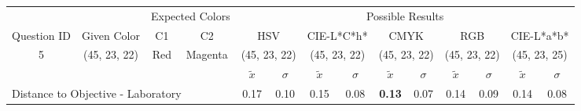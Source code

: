 \begin{table}[H]
  \resizebox{\textwidth}{!} {
  \begin{tabular}{lccccccccccccc}
    \hline
    \multicolumn{1}{c}{}                              &                                      & \multicolumn{2}{c}{Expected Colors}                   & \multicolumn{10}{c}{Possible Results}                                                                                                                                                                                                                                                                                        \\ \cline{3-14}
    \multicolumn{1}{c}{\multirow{-2}{*}{Question ID}} & \multirow{-2}{*}{Given Color}        & C1                       & C2                         & \multicolumn{2}{c}{HSV}                                        & \multicolumn{2}{c}{CIE-L*C*h*}                                 & \multicolumn{2}{c}{CMYK}                                       & \multicolumn{2}{c}{RGB}                                        & \multicolumn{2}{c}{CIE-L*a*b*}                                 \\ \hline
    \multicolumn{1}{c}{5}                             & \cellcolor[HTML]{FF0080}(45, 23, 22) & \multicolumn{1}{c|}{Red} & \multicolumn{1}{c|}{Magenta}  & \multicolumn{2}{c|}{\cellcolor[HTML]{FF0080}(45, 23, 22)}      & \multicolumn{2}{c|}{\cellcolor[HTML]{FF0080}(45, 23, 22)}       & \multicolumn{2}{c|}{\cellcolor[HTML]{FF0080}(45, 23, 22)}       & \multicolumn{2}{c|}{\cellcolor[HTML]{FF0080}(45, 23, 22)}       & \multicolumn{2}{c|}{\cellcolor[HTML]{FF0087}(45, 23, 25)}       \\ \hline
                                                      & \multicolumn{1}{l}{}                 & \multicolumn{1}{l}{}     & \multicolumn{1}{l}{}       & \multicolumn{1}{c}{$\tilde{x}$} & \multicolumn{1}{c}{$\sigma$} & \multicolumn{1}{c}{$\tilde{x}$} & \multicolumn{1}{c}{$\sigma$} & \multicolumn{1}{c}{$\tilde{x}$} & \multicolumn{1}{c}{$\sigma$} & \multicolumn{1}{c}{$\tilde{x}$} & \multicolumn{1}{c}{$\sigma$} & \multicolumn{1}{c}{$\tilde{x}$} & \multicolumn{1}{c}{$\sigma$} \\ \hline
    \multicolumn{4}{l}{Distance to Objective - Laboratory}                                                                                           & \multicolumn{1}{|c}{0.17}       & \multicolumn{1}{c|}{0.10}    & \multicolumn{1}{|c}{0.15}       & \multicolumn{1}{c|}{0.08}    & \multicolumn{1}{|c}{\textbf{0.13}}       & \multicolumn{1}{c|}{0.07}    & \multicolumn{1}{|c}{0.14}       & \multicolumn{1}{c|}{0.09}    & \multicolumn{1}{|c}{0.14}       & \multicolumn{1}{c|}{0.08}    \\

\end{tabular}}
\end{table}
